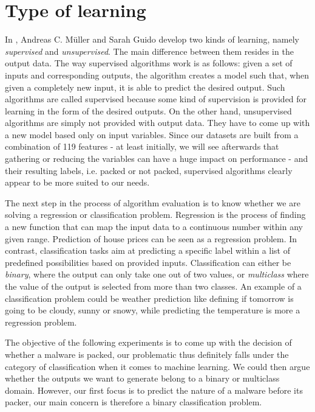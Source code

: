\section{Type of learning}

In \cite{ML}, Andreas C. Müller and Sarah Guido develop two kinds of learning, namely \textit{supervised} and \textit{unsupervised}. The main difference between them resides in the output data. The way supervised algorithms work is as follows: given a set of inputs and corresponding outputs, the algorithm creates a model such that, when given a completely new input, it is able to predict the desired output. Such algorithms are called supervised because some kind of supervision is provided for learning in the form of the desired outputs. On the other hand, unsupervised algorithms are simply not provided with output data. They have to come up with a new model based only on input variables. Since our datasets are built from a combination of 119 features - at least initially, we will see afterwards that gathering or reducing the variables can have a huge impact on performance - and their resulting labels, i.e. packed or not packed, supervised algorithms clearly appear to be more suited to our needs.

The next step in the process of algorithm evaluation is to know whether we are solving a regression or classification problem. Regression is the process of finding a new function that can map the input data to a continuous number within any given range. Prediction of house prices can be seen as a regression problem. In contrast, classification tasks aim at predicting a specific label within a list of predefined possibilities based on provided inputs. Classification can either be \textit{binary}, where the output can only take one out of two values, or \textit{multiclass} where the value of the output is selected from more than two classes. An example of a classification problem could be weather prediction like defining if tomorrow is going to be cloudy, sunny or snowy, while predicting the temperature is more a regression problem.

The objective of the following experiments is to come up with the decision of whether a malware is packed, our problematic thus definitely falls under the category of classification when it comes to machine learning. We could then argue whether the outputs we want to generate belong to a binary or multiclass domain. However, our first focus is to predict the nature of a malware before its packer, our main concern is therefore a binary classification problem. 